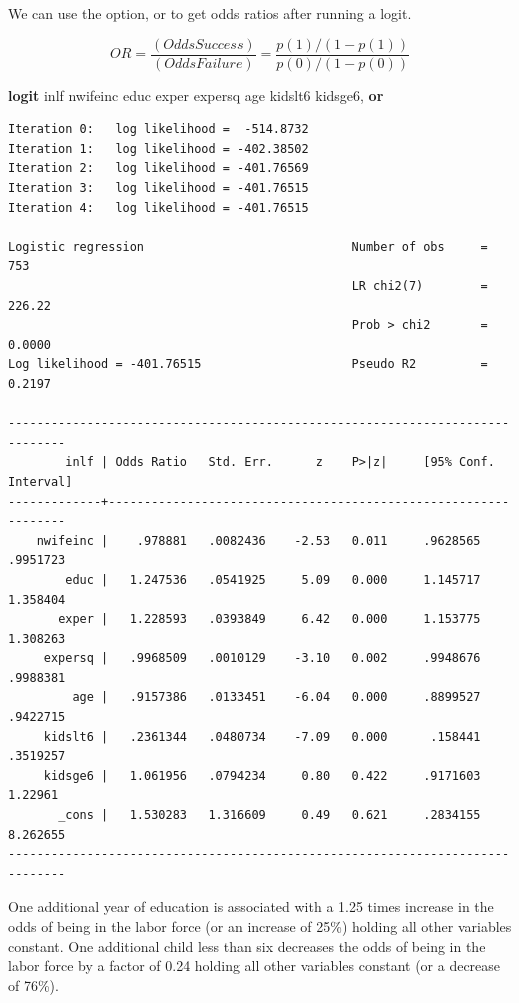 \documentclass[
]{book}
\newenvironment{Shaded}{\begin{snugshade}}{\end{snugshade}}
\newcommand{\KeywordTok}[1]{\textcolor[rgb]{0.13,0.29,0.53}{\textbf{#1}}}
\newcommand{\NormalTok}[1]{#1}
\begin{document}
We can use the option, or to get odds ratios after running a logit.

\[ OR = \frac{(Odds Success)}{(Odds Failure)} = \frac{p(1)/(1-p(1))}{p(0)/(1-p(0))} \]

\begin{Shaded}
\begin{Highlighting}[]
\KeywordTok{logit}\NormalTok{ inlf nwifeinc educ exper expersq age kidslt6 kidsge6, }\KeywordTok{or}
\end{Highlighting}
\end{Shaded}

\begin{verbatim}
Iteration 0:   log likelihood =  -514.8732  
Iteration 1:   log likelihood = -402.38502  
Iteration 2:   log likelihood = -401.76569  
Iteration 3:   log likelihood = -401.76515  
Iteration 4:   log likelihood = -401.76515  

Logistic regression                             Number of obs     =        753
                                                LR chi2(7)        =     226.22
                                                Prob > chi2       =     0.0000
Log likelihood = -401.76515                     Pseudo R2         =     0.2197

------------------------------------------------------------------------------
        inlf | Odds Ratio   Std. Err.      z    P>|z|     [95% Conf. Interval]
-------------+----------------------------------------------------------------
    nwifeinc |    .978881   .0082436    -2.53   0.011     .9628565    .9951723
        educ |   1.247536   .0541925     5.09   0.000     1.145717    1.358404
       exper |   1.228593   .0393849     6.42   0.000     1.153775    1.308263
     expersq |   .9968509   .0010129    -3.10   0.002     .9948676    .9988381
         age |   .9157386   .0133451    -6.04   0.000     .8899527    .9422715
     kidslt6 |   .2361344   .0480734    -7.09   0.000      .158441    .3519257
     kidsge6 |   1.061956   .0794234     0.80   0.422     .9171603     1.22961
       _cons |   1.530283   1.316609     0.49   0.621     .2834155    8.262655
------------------------------------------------------------------------------
\end{verbatim}

One additional year of education is associated with a 1.25 times increase in the odds of
being in the labor force (or an increase of 25\%) holding all other variables constant.
One additional child less than six decreases the odds of being in the labor force
by a factor of 0.24 holding all other variables constant (or a decrease of 76\%).
\end{document}
